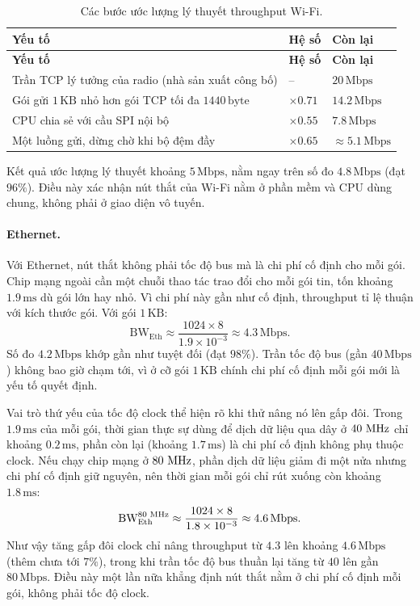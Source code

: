 \begin{longtable}{|p{9.5cm}|p{2cm}|p{2.5cm}|}
    \caption{Các bước ước lượng lý thuyết throughput Wi-Fi.}
    \label{tab:wifi_theory} \\
    \hline
    \textbf{Yếu tố} & \textbf{Hệ số} & \textbf{Còn lại} \\ \hline
    \endfirsthead
    \hline
    \textbf{Yếu tố} & \textbf{Hệ số} & \textbf{Còn lại} \\ \hline
    \endhead
    \hline
    \endfoot
    \endlastfoot
    Trần TCP lý tưởng của radio (nhà sản xuất công bố) & -- & $20\,\text{Mbps}$ \\ \hline
    Gói gửi $1\,\text{KB}$ nhỏ hơn gói TCP tối đa $1440\,\text{byte}$ & $\times 0{.}71$ & $14{.}2\,\text{Mbps}$ \\ \hline
    CPU chia sẻ với cầu SPI nội bộ & $\times 0{.}55$ & $7{.}8\,\text{Mbps}$ \\ \hline
    Một luồng gửi, dừng chờ khi bộ đệm đầy & $\times 0{.}65$ & $\approx 5{.}1\,\text{Mbps}$ \\ \hline
\end{longtable}

Kết quả ước lượng lý thuyết khoảng $5\,\text{Mbps}$, nằm ngay trên số đo $4{.}8\,\text{Mbps}$ (đạt $96\%$). Điều này xác nhận nút thắt của Wi-Fi nằm ở phần mềm và CPU dùng chung, không phải ở giao diện vô tuyến.

\paragraph{Ethernet.}
Với Ethernet, nút thắt không phải tốc độ bus mà là chi phí cố định cho mỗi gói. Chip mạng ngoài cần một chuỗi thao tác trao đổi cho mỗi gói tin, tốn khoảng $1{.}9\,\text{ms}$ dù gói lớn hay nhỏ. Vì chi phí này gần như cố định, throughput tỉ lệ thuận với kích thước gói. Với gói $1\,\text{KB}$:
\[
\text{BW}_\text{Eth} \approx \frac{1024 \times 8}{1{.}9 \times 10^{-3}} \approx 4{.}3\,\text{Mbps}.
\]
Số đo $4{.}2\,\text{Mbps}$ khớp gần như tuyệt đối (đạt $98\%$). Trần tốc độ bus (gần $40\,\text{Mbps}$) không bao giờ chạm tới, vì ở cỡ gói $1\,\text{KB}$ chính chi phí cố định mỗi gói mới là yếu tố quyết định.

Vai trò thứ yếu của tốc độ clock thể hiện rõ khi thử nâng nó lên gấp đôi. Trong $1{.}9\,\text{ms}$ của mỗi gói, thời gian thực sự dùng để dịch dữ liệu qua dây ở $40\,\text{\,MHz}$ chỉ khoảng $0{.}2\,\text{ms}$, phần còn lại (khoảng $1{.}7\,\text{ms}$) là chi phí cố định không phụ thuộc clock. Nếu chạy chip mạng ở $80\,\text{\,MHz}$, phần dịch dữ liệu giảm đi một nửa nhưng chi phí cố định giữ nguyên, nên thời gian mỗi gói chỉ rút xuống còn khoảng $1{.}8\,\text{ms}$:
\[
\text{BW}_\text{Eth}^{80\,\text{\,MHz}} \approx \frac{1024 \times 8}{1{.}8 \times 10^{-3}} \approx 4{.}6\,\text{Mbps}.
\]
Như vậy tăng gấp đôi clock chỉ nâng throughput từ $4{.}3$ lên khoảng $4{.}6\,\text{Mbps}$ (thêm chưa tới $7\%$), trong khi trần tốc độ bus thuần lại tăng từ $40$ lên gần $80\,\text{Mbps}$. Điều này một lần nữa khẳng định nút thắt nằm ở chi phí cố định mỗi gói, không phải tốc độ clock.

